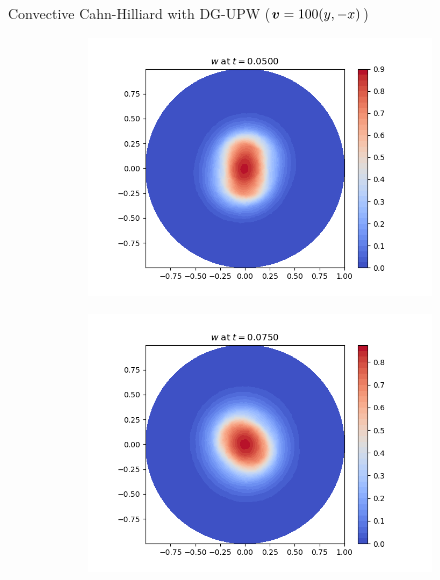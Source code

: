 \begin{frame}{Convective Cahn-Hilliard with DG-UPW \small{($\boldsymbol{v}=100(y,-x)$)}}
\begin{figure}[t]
		\begin{subfigure}{0.49\textwidth}
			\centering
			\includegraphics[scale=0.28]{img/convective-cahn-hilliard/w_DG-UPW+Eyre_nt-100_t-0.05000_P0_adv-100.0_nx-50.png}
		\end{subfigure}
		\hspace*{-1.5cm}
		\begin{subfigure}{0.49\textwidth}
			\centering
			\includegraphics[scale=0.28]{img/convective-cahn-hilliard/w_DG-UPW+Eyre_nt-100_t-0.07500_P0_adv-100.0_nx-50.png}
		\end{subfigure}
	\end{figure}
\end{frame}

